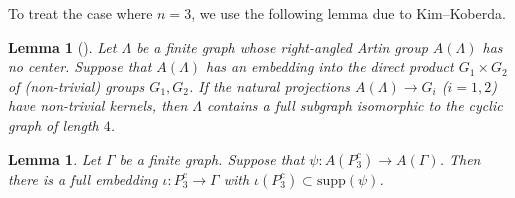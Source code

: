 \documentclass{amsart}
\theoremstyle{definition}
\theoremstyle{plain}
\newtheorem{lemma}[definition]{Lemma}
\numberwithin{equation}{section}
\begin{document}
To treat the case where $n=3$, we use the following lemma due to Kim--Koberda. 

\begin{lemma}[{\cite[Theorem 5.4]{Kim--Koberda13}}]
Let $\Lambda$ be a finite graph whose right-angled Artin group $A(\Lambda)$ has no center. 
Suppose that $A(\Lambda)$ has an embedding into the direct product $G_1 \times G_2$ of (non-trivial) groups $G_1, G_2$. 
If the natural projections $A(\Lambda) \rightarrow  G_i$ ($i=1,2$) have non-trivial kernels, then $\Lambda$ contains a full subgraph isomorphic to the cyclic graph of length $4$. 
\label{Kim--Koberda-P_3^c}
\end{lemma}


\begin{lemma}
Let $\Gamma$ be a finite graph. 
Suppose that $\psi \colon A(P_3^c) \rightarrow A(\Gamma)$. 
Then there is a full embedding $\iota \colon P_3^c \rightarrow \Gamma$ with $\iota(P_3^c) \subset \mathrm{supp}(\psi)$. 
\label{one-component-anti-path-3}
\end{lemma}
\end{document}
